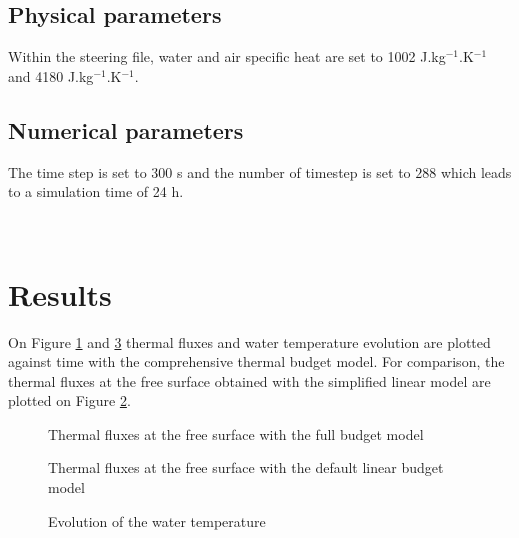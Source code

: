 \subsection{Physical parameters}
Within the \khione steering file, water and air specific heat are set to 1002 J.kg$^{-1}$.K$^{-1}$ and 4180 J.kg$^{-1}$.K$^{-1}$.

\subsection{Numerical parameters}
The time step is set to 300 s and the number of timestep is set to $288$ which leads to a simulation time of 24 h.

~\newline
\section{Results}
On Figure \ref{fig:thermal_fluxes} and \ref{fig:thermal_temp} thermal fluxes and water temperature evolution are plotted against time with the comprehensive thermal budget model.
For comparison, the thermal fluxes at the free surface obtained with the simplified linear model are plotted on Figure \ref{fig:thermal_fluxes_linear}.

\begin{figure}[H]
    \begin{center}
    \end{center}
    \caption{Thermal fluxes at the free surface with the full budget model}
    \label{fig:thermal_fluxes}
\end{figure}

\begin{figure}[H]
    \begin{center}
    \end{center}
    \caption{Thermal fluxes at the free surface with the default linear budget model}
    \label{fig:thermal_fluxes_linear}
\end{figure}

\begin{figure}[H]
    \begin{center}
    \end{center}
    \caption{Evolution of the water temperature}
    \label{fig:thermal_temp}
\end{figure}

